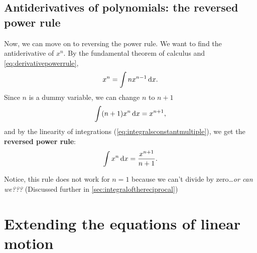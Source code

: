 \subsection{Antiderivatives of polynomials: the reversed power rule}

Now, we can move on to reversing the power rule. We want to find the antiderivative of $x^n$. By the fundamental theorem of calculus and \cref{eq:derivativepowerrule},
\begin{equation*}
    x^n = \int nx^{n - 1} \odif{x}.
\end{equation*}
Since $n$ is a dummy variable, we can change $n$ to $n + 1$
\begin{equation*}
    \int (n + 1)x^{n}\odif{x} = x^{n + 1},
\end{equation*}
and by the linearity of integrations (\cref{eq:integralsconstantmultiple}), we get the \textbf{reversed power rule}:
\begin{equation}
    \int x^{n}\odif{x} = \frac{x^{n + 1}}{n + 1}.
\end{equation}

Notice, this rule does not work for $n = 1$ because we can't divide by zero\dots \emph{or can we???} (Discussed further in \cref{sec:integralofthereciprocal})

\section{Extending the equations of linear motion}

